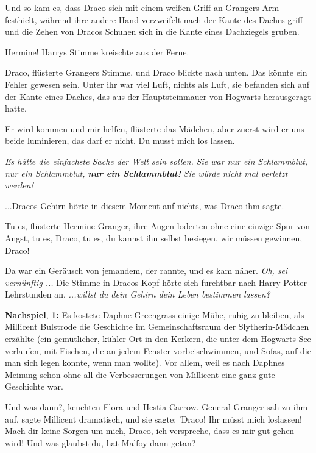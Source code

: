 Und so kam es, dass Draco sich mit einem weißen Griff an Grangers Arm festhielt,
während ihre andere Hand verzweifelt nach der Kante des Daches griff und die
Zehen von Dracos Schuhen sich in die Kante eines Dachziegels gruben.

\glqq{}Hermine!\grqq{} Harrys Stimme kreischte aus der Ferne.

\glqq{}Draco\grqq{}, flüsterte Grangers Stimme, und Draco blickte nach unten. Das
könnte ein Fehler gewesen sein. Unter ihr war viel Luft, nichts als Luft, sie
befanden sich auf der Kante eines Daches, das aus der Hauptsteinmauer von
Hogwarts herausgeragt hatte.

\glqq{}Er wird kommen und mir helfen\grqq{}, flüsterte das Mädchen, \glqq{}aber
zuerst wird er uns beide luminieren, das darf er nicht. Du musst mich los
lassen.\grqq{}

\emph{Es hätte die einfachste Sache der Welt sein sollen.}
\emph{Sie war nur ein Schlammblut, nur ein Schlammblut,} \textbf{\emph{nur ein
Schlammblut!}}\emph{ Sie würde nicht mal verletzt werden!}

...Dracos Gehirn hörte in diesem Moment auf nichts, was Draco ihm sagte.

\glqq{}Tu es\grqq{}, flüsterte Hermine Granger, ihre Augen loderten ohne eine
einzige Spur von Angst, \glqq{}tu es, Draco, tu es, du kannst ihn selbst
besiegen, wir müssen gewinnen, Draco!\grqq{}

Da war ein Geräusch von jemandem, der rannte, und es kam näher. \emph{ Oh, sei
vernünftig ...} Die Stimme in Dracos Kopf hörte sich furchtbar nach Harry
Potter-Lehrstunden an.
\emph{...willst du dein Gehirn dein Leben bestimmen lassen?}

\textbf{Nachspiel}, \textbf{1:} Es kostete Daphne Greengrass einige Mühe, ruhig
zu bleiben, als Millicent Bulstrode die Geschichte im Gemeinschaftsraum der
Slytherin-Mädchen erzählte (ein gemütlicher, kühler Ort in den Kerkern, die
unter dem Hogwarts-See verlaufen, mit Fischen, die an jedem Fenster
vorbeischwimmen, und Sofas, auf die man sich legen konnte, wenn man wollte). Vor
allem, weil es nach Daphnes Meinung schon ohne all die Verbesserungen von
Millicent eine ganz gute Geschichte war.

\glqq{}Und was dann?\grqq{}, keuchten Flora und Hestia Carrow. \glqq{}General
Granger sah zu ihm auf\grqq{}, sagte Millicent dramatisch, \glqq{}und sie sagte:
'Draco! Ihr müsst mich loslassen! Mach dir keine Sorgen um mich, Draco, ich
verspreche, dass es mir gut gehen wird! Und was glaubst du, hat Malfoy dann
getan?\grqq{}


